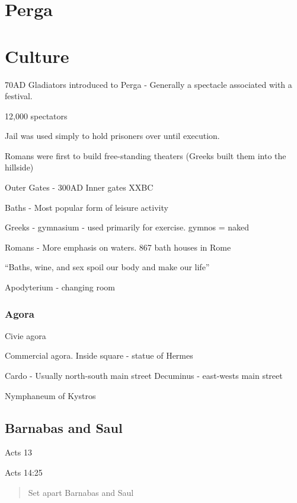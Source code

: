 \documentclass[
]{book}
\begin{document}
\hypertarget{perga}{%
\chapter{Perga}\label{perga}}

\hypertarget{culture}{%
\chapter{Culture}\label{culture}}

70AD Gladiators introduced to Perga - Generally a spectacle associated with a festival.

12,000 spectators

Jail was used simply to hold prisoners over until execution.

Romans were first to build free-standing theaters (Greeks built them into the hillside)

Outer Gates - 300AD Inner gates XXBC

Baths - Most popular form of leisure activity

Greeks - gymnasium - used primarily for exercise. gymnos = naked

Romans - More emphasis on waters. 867 bath houses in Rome

``Baths, wine, and sex spoil our body and make our life''

Apodyterium - changing room

\hypertarget{agora}{%
\subsection{Agora}\label{agora}}

Civie agora

Commercial agora. Inside square - statue of Hermes

Cardo - Usually north-south main street
Decuminus - east-wests main street

Nymphaneum of Kystros

\hypertarget{barnabas-and-saul}{%
\section{Barnabas and Saul}\label{barnabas-and-saul}}

Acts 13

Acts 14:25

\begin{quote}
Set apart Barnabas and Saul
\end{quote}
\end{document}
